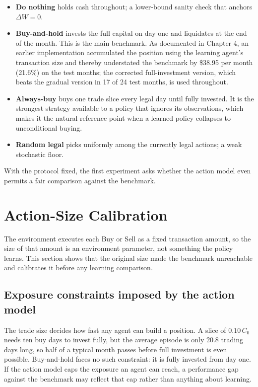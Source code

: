 \begin{itemize}
  \item \textbf{Do nothing} holds cash throughout; a lower-bound sanity
        check that anchors $\Delta W = 0$.
  \item \textbf{Buy-and-hold} invests the full capital on day one and
        liquidates at the end of the month. This is the main benchmark. As
        documented in Chapter 4, an earlier implementation accumulated the
        position using the learning agent's transaction size and thereby
        understated the benchmark by \$38.95 per month (21.6\%) on the test
        months; the corrected full-investment version, which beats the
        gradual version in 17 of 24 test months, is used throughout.
  \item \textbf{Always-buy} buys one trade slice every legal day until
        fully invested. It is the strongest strategy available to a policy
        that ignores its observations, which makes it the natural reference
        point when a learned policy collapses to unconditional buying.
  \item \textbf{Random legal} picks uniformly among the currently legal
        actions; a weak stochastic floor.
\end{itemize}

With the protocol fixed, the first experiment asks whether the action model
even permits a fair comparison against the benchmark.

\section{Action-Size Calibration}

The environment executes each Buy or Sell as a fixed transaction amount, so
the size of that amount is an environment parameter, not something the
policy learns. This section shows that the original size made the benchmark
unreachable and calibrates it before any learning comparison.

\subsection{Exposure constraints imposed by the action model}

The trade size decides how fast any agent can build a position. A slice of
$0.10\,C_0$ needs ten buy days to invest fully, but the average episode is
only 20.8 trading days long, so half of a typical month passes before full
investment is even possible. Buy-and-hold faces no such constraint: it is
fully invested from day one. If the action model caps the exposure an agent
can reach, a performance gap against the benchmark may reflect that cap
rather than anything about learning.

